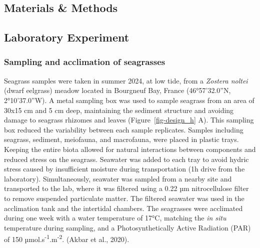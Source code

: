 \documentclass[
  letterpaper,
  11pt,
  english,
  singlespacing,
  headsepline]{MastersDoctoralThesis}
\begin{document}
\begin{spacing}{1.5}
\section{Materials \& Methods}\label{materials-methods-1}

\subsection{Laboratory Experiment}\label{laboratory-experiment}

\subsubsection{Sampling and acclimation of
seagrasses}\label{sampling-and-acclimation-of-seagrasses}

Seagrass samples were taken in summer 2024, at low tide, from a
\emph{Zostera noltei} (dwarf eelgrass) meadow located in Bourgneuf Bay,
France (46°57'32.0''N, 2°10'37.0''W). A metal sampling box was used to
sample seagrass from an area of 30x15 cm and 5 cm deep, maintaining the
sediment structure and avoiding damage to seagrass rhizomes and leaves
(Figure~\ref{fig-design_h} A). This sampling box reduced the variability
between each sample replicates. Samples including seagrass, sediment,
meiofauna, and macrofauna, were placed in plastic trays. Keeping the
entire biota allowed for natural interactions between components and
reduced stress on the seagrass. Seawater was added to each tray to avoid
hydric stress caused by insufficient moisture during transportation (1h
drive from the laboratory). Simultaneously, seawater was sampled from a
nearby site and transported to the lab, where it was filtered using a
0.22 µm nitrocellulose filter to remove suspended particulate matter.
The filtered seawater was used in the acclimation tank and the
intertidal chambers. The seagrasses were acclimated during one week with
a water temperature of 17°C, matching the \emph{in situ} temperature
during sampling, and a Photosynthetically Active Radiation (PAR) of 150
µmol.s\textsuperscript{-1}.m\textsuperscript{-2}. (Akbar et al., 2020).

\begin{figure}

\centering{

}
\end{figure}
\end{spacing}
\end{document}
